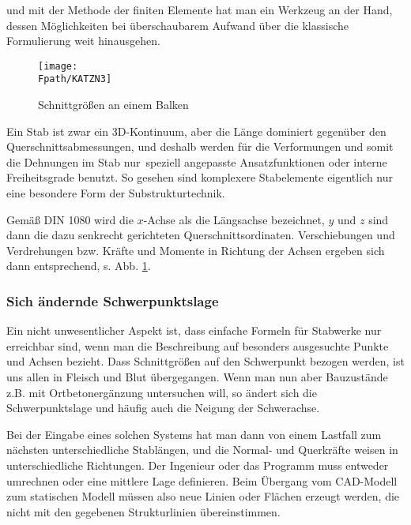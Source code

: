 \noindent und mit der Methode der finiten Elemente hat man
ein Werkzeug an der Hand, dessen M\"{o}glichkeiten bei \"{u}berschaubarem Aufwand \"{u}ber die klassische Formulierung weit hinausgehen.
\begin{figure}[tbp] \centering
\if {} \sidecaption \fi
\texttt{[image: \\Fpath/KATZN3]}
\caption{Schnittgr\"{o}{\ss}en an einem Balken}
\label{KatzN3}%
\end{figure}%

Ein Stab ist zwar ein 3D-Kontinuum, aber die L\"{a}nge dominiert gegen\"{u}ber den Querschnittsabmessungen, und deshalb werden f\"{u}r die Verformungen und somit die Dehnungen im Stab \glq nur\grq\ speziell angepasste Ansatzfunktionen oder interne Freiheitsgrade benutzt. So gesehen sind komplexere Stabelemente eigentlich nur eine besondere Form der Substrukturtechnik.

Gem\"{a}{\ss} DIN 1080 wird die $x$-Achse als die L\"{a}ngsachse bezeichnet, $y$ und $z$ sind dann die dazu senkrecht gerichteten  Querschnittsordinaten. Verschiebungen und Verdrehungen bzw. Kr\"{a}fte und Momente in Richtung der Achsen ergeben sich dann entsprechend, s. Abb. \ref{KatzN3}.
\vspace{-0.1cm}
{\textcolor{sectionTitleBlue}{\subsubsection*{Sich \"{a}ndernde Schwerpunktslage}}}

Ein nicht unwesentlicher Aspekt ist, dass einfache Formeln f\"{u}r Stabwerke nur erreichbar sind, wenn man die Beschreibung auf besonders ausgesuchte Punkte und Achsen bezieht. Dass Schnittgr\"{o}{\ss}en auf den Schwerpunkt bezogen werden, ist uns allen in Fleisch und Blut \"{u}bergegangen. Wenn man nun aber Bauzust\"{a}nde z.B. mit Ortbetonerg\"{a}nzung untersuchen will, so \"{a}ndert sich die Schwerpunktslage und h\"{a}ufig auch die Neigung der Schwerachse.

Bei der Eingabe eines solchen Systems hat man dann von einem Lastfall zum n\"{a}chsten unterschiedliche Stabl\"{a}ngen, und die Normal- und Querkr\"{a}fte weisen in unterschiedliche Richtungen. Der Ingenieur oder das Programm muss entweder umrechnen oder eine mittlere Lage definieren. Beim \"{U}bergang vom CAD-Modell zum statischen Modell m\"{u}ssen also neue Linien oder Fl\"{a}chen erzeugt werden, die nicht mit den gegebenen Strukturlinien \"{u}bereinstimmen.

